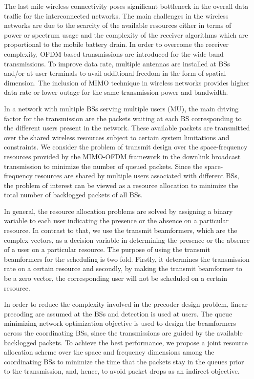 
The last mile wireless connectivity poses significant bottleneck in the overall data traffic for the interconnected networks. The main challenges in the wireless networks are due to the scarcity of the available resources either in terms of power or spectrum usage and the complexity of the receiver algorithms which are proportional to the mobile battery drain. In order to overcome the receiver complexity, \ac{OFDM} based transmissions are introduced for the wide band transmissions. To improve data rate, multiple antennas are installed at \acp{BS} and/or at user terminals to avail additional freedom in the form of spatial dimension. The inclusion of \ac{MIMO} technique in wireless networks provides higher data rate or lower outage for the same transmission power and bandwidth.

In a network with multiple \acp{BS} serving multiple users (\acs{MU}), the main driving factor for the transmission are the packets waiting at each \ac{BS} corresponding to the different users present in the network. These available packets are transmitted over the shared wireless resources subject to certain system limitations and constraints. We consider the problem of transmit design over the space-frequency resources provided by the \acs{MIMO}-\ac{OFDM} framework in the downlink broadcast transmission to minimize the number of queued packets. Since the space-frequency resources are shared by multiple users associated with different \acp{BS}, the problem of interest can be viewed as a resource allocation to minimize the total number of backlogged packets of all \acp{BS}.

In general, the resource allocation problems are solved by assigning a binary variable to each user indicating the presence or the absence on a particular resource. In contrast to that, we use the transmit beamformers, which are the complex vectors, as a decision variable in determining the presence or the absence of a user on a particular resource. The purpose of using the transmit beamformers for the scheduling is two fold. Firstly, it determines the transmission rate on a certain resource and secondly, by making the transmit beamformer to be a zero vector, the corresponding user will not be scheduled on a certain resource.

In order to reduce the complexity involved in the precoder design problem, linear precoding are assumed at the \acp{BS} and detection is used at users. The queue minimizing network optimization objective is used to design the beamformers across the coordinating \acp{BS}, since the transmissions are guided by the available backlogged packets. To achieve the best performance, we propose a joint resource allocation scheme over the space and frequency dimensions among the coordinating \acp{BS} to minimize the time that the packets stay in the queues prior to the transmission, and, hence, to avoid packet drops as an indirect objective.


